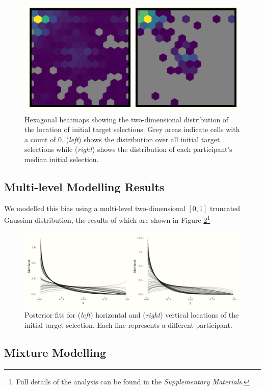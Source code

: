 \documentclass[vision,article,submit,pdftex,moreauthors]{Definitions/mdpi}
\begin{document}
\begin{figure}[H]
\centering
\includegraphics[width=12 cm]{Figures/init_sel_hex_plot.pdf}
\caption{Hexagonal heatmaps showing the two-dimensional distribution of the location of initial target selections. Grey areas indicate cells with a count of 0. (\textit{left}) shows the distribution over all initial target selections while (\textit{right}) shows the distribution of each participant's median initial selection. }
\label{fig:qjep_init_sel_hex}
\end{figure} 

\subsection{Multi-level Modelling Results}
We modelled this bias using a multi-level two-dimensional $[0, 1]$ truncated Gaussian distribution, the results of which are shown in Figure \ref{fig:qjep_init_sel_mdl}\footnote{Full details of the analysis can be found in the \textit{Supplementary Materials}.}

\begin{figure}[H]
\centering
\includegraphics[width=12 cm]{Figures/init_sel_mdl.pdf}
\caption{Posterior fits for (\textit{left}) horizontal and (\textit{right}) vertical locations of the initial target selection. Each line represents a different participant.}
\label{fig:qjep_init_sel_mdl}
\end{figure} 

\subsection{Mixture Modelling}
\end{document}
